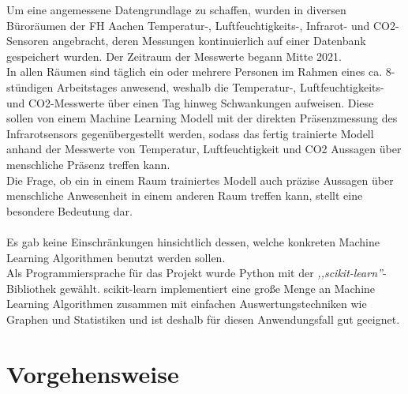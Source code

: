 Um eine angemessene Datengrundlage zu schaffen, wurden in diversen Büroräumen der FH Aachen Temperatur-,
Luftfeuchtigkeits-, Infrarot- und CO2-Sensoren angebracht, deren Messungen kontinuierlich auf einer Datenbank
gespeichert wurden. Der Zeitraum der Messwerte begann Mitte 2021.\\
In allen Räumen sind täglich ein oder mehrere
Personen im Rahmen eines ca. 8-stündigen Arbeitstages anwesend, weshalb die Temperatur-, Luftfeuchtigkeits-
und CO2-Messwerte über einen Tag hinweg Schwankungen aufweisen. Diese sollen von einem Machine Learning Modell
mit der direkten Präsenzmessung des Infrarotsensors gegenübergestellt werden, sodass das fertig trainierte Modell
anhand der Messwerte von Temperatur, Luftfeuchtigkeit und CO2 Aussagen über menschliche Präsenz treffen kann.\\
Die Frage, ob ein in einem Raum trainiertes Modell auch präzise Aussagen über menschliche Anwesenheit in einem anderen Raum
treffen kann, stellt eine besondere Bedeutung dar.\\\\
Es gab keine Einschränkungen hinsichtlich dessen, welche konkreten Machine Learning Algorithmen 
benutzt werden sollen.\\
Als Programmiersprache für das Projekt wurde Python mit der \textit{,,scikit-learn''}-Bibliothek gewählt. scikit-learn
implementiert eine große Menge an Machine Learning Algorithmen zusammen mit einfachen Auswertungstechniken 
wie Graphen und Statistiken und ist deshalb für diesen Anwendungsfall gut geeignet.






\newpage

\section{Vorgehensweise}


